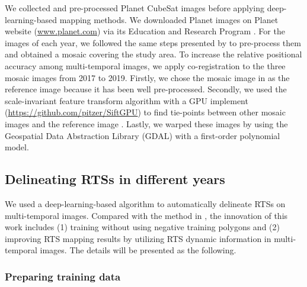 \documentclass[authoryear,preprint,review,12pt]{elsarticle}
\begin{document}
We collected and pre-processed Planet CubeSat images before applying deep-learning-based mapping methods. 
We downloaded Planet images on Planet website (\url{www.planet.com}) via its Education and Research Program \citep{team2017planet}. 
For the images of each year, we followed the same steps presented by \cite{huang2020using} to pre-process them and obtained a mosaic covering the study area. 
To increase the relative positional accuracy among multi-temporal images, we apply co-registration to the three mosaic images from 2017 to 2019. 
Firstly, we chose the mosaic image in \cite{huang2020using} as the reference image because it has been well pre-processed. Secondly, we used the scale-invariant feature transform algorithm \citep{lowe2004distinctive} with a GPU implement (\url{https://github.com/pitzer/SiftGPU}) to find tie-points between other mosaic images and the reference image \citep{huang2016a}. 
Lastly, we warped these images by using the Geospatial Data Abstraction Library (GDAL) with a first-order polynomial model.



\subsection{Delineating RTSs in different years}
\label{sec_delineating}

We used a deep-learning-based algorithm \citep{huang2020using} to automatically delineate RTSs on multi-temporal images.
Compared with the method in \cite{huang2020using},  the innovation of this work includes (1) training without using negative training polygons and (2) improving RTS mapping results by utilizing RTS dynamic information in multi-temporal images. 
The details will be presented as the following.


\subsubsection{Preparing training data} 
\label{sec_prepare_training}
\end{document}
